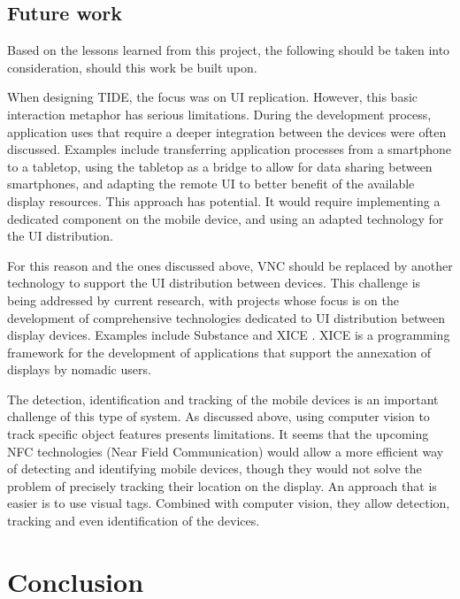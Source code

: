 \section{Future work}
\label{sec:fw}

Based on the lessons learned from this project, the following should be taken into consideration, should this work be built upon.

When designing TIDE, the focus was on UI replication.
However, this basic interaction metaphor has serious limitations.
During the development process, application uses that require a deeper integration between the devices were often discussed.
Examples include transferring application processes from a smartphone to a tabletop, using the tabletop as a bridge to allow for data sharing between smartphones, and adapting the remote UI to better benefit of the available display resources.
This approach has potential.
It would require implementing a dedicated component on the mobile device, and using an adapted technology for the UI distribution.

For this reason and the ones discussed above, VNC should be replaced by another technology to support the UI distribution between devices.
This challenge is being addressed by current research, with projects whose focus is on the development of comprehensive technologies dedicated to UI distribution between display devices.
Examples include Substance \citep{Gjerlufsen:2011:substance} and XICE \citep{Arthur:2011:xice}.
XICE is a programming framework for the development of applications that support the annexation of displays by nomadic users.

The detection, identification and tracking of the mobile devices is an important challenge of this type of system.
As discussed above, using computer vision to track specific object features presents limitations.
It seems that the upcoming NFC technologies (Near Field Communication) would allow a more efficient way of detecting and identifying mobile devices, though they would not solve the problem of precisely tracking their location on the display.
An approach that is easier is to use visual tags.
Combined with computer vision, they allow detection, tracking and even identification of the devices.

\chapter{Conclusion}
\label{conclusion}

